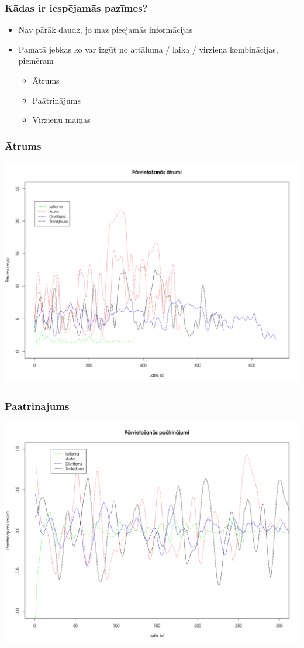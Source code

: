 \documentclass[xelatex,mathserif,serif]{beamer}
\newlength{\wideitemsep}
\let\olditem\item
\renewcommand{\item}{\setlength{\itemsep}{\wideitemsep}\olditem}
\begin{document}
\begin{frame}
  \frametitle{Kādas ir iespējamās pazīmes?}
  \begin{itemize}
    \item Nav pārāk daudz, jo maz pieejamās informācijas
    \item Pamatā jebkas ko var izgūt no attāluma / laika / virziena kombinācijas, piemēram
      \begin{itemize}
      \item Ātrums
      \item Paātrinājums
      \item Virzienu maiņas
      \end{itemize}
  \end{itemize}
\end{frame}

\begin{frame}
  \frametitle{Ātrums}
  \includegraphics[scale=0.3]{img/speed_comparison}
\end{frame}

\begin{frame}
  \frametitle{Paātrinājums}
  \includegraphics[scale=0.3]{img/acceleration_comparison}
\end{frame}
\end{document}
